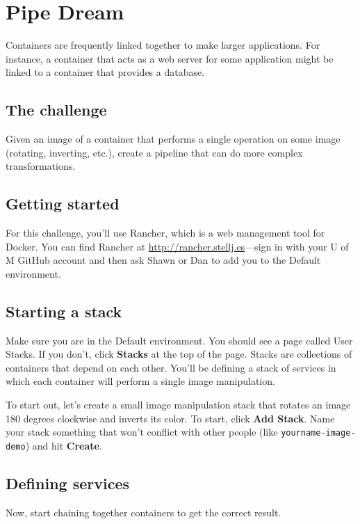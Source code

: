 \chapter*{Pipe Dream}

Containers are frequently linked together to make larger applications. For instance, a container that acts as a web server for some application might be linked to a container that provides a database.

\section*{The challenge}

Given an image of a container that performs a single operation on some image (rotating, inverting, etc.), create a pipeline that can do more complex transformations.

\section*{Getting started}

For this challenge, you'll use Rancher, which is a web management tool for Docker. You can find Rancher at \url{http://rancher.stellj.es}---sign in with your U of M GitHub account and then ask Shawn or Dan to add you to the Default environment.

\section*{Starting a stack}

Make sure you are in the Default environment. You should see a page called User Stacks. If you don't, click \textbf{Stacks} at the top of the page. Stacks are collections of containers that depend on each other. You'll be defining a stack of services in which each container will perform a single image manipulation.

To start out, let's create a small image manipulation stack that rotates an image 180 degrees clockwise and inverts its color. To start, click \textbf{Add Stack}. Name your stack something that won't conflict with other people (like \texttt{yourname-image-demo}) and hit \textbf{Create}.

\section*{Defining services}

Now, start chaining together containers to get the correct result.

